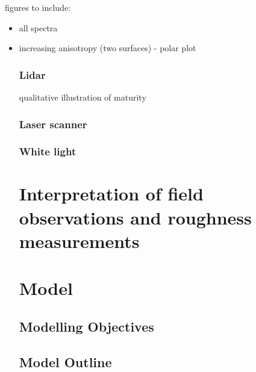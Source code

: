 \documentclass[12pt,a4paper]{article}
\begin{document}
figures to include:
\begin{itemize}
\item all spectra
\item increasing anisotropy (two surfaces) - polar plot

\subsubsection{Lidar}
qualitative illustration of maturity

\subsubsection{Laser scanner}

\subsubsection{White light}

\section{Interpretation of field observations and roughness measurements}


\section{Model}
	\subsection{Modelling Objectives}
	\subsection{Model Outline}
	

\end{itemize}
\end{document}
